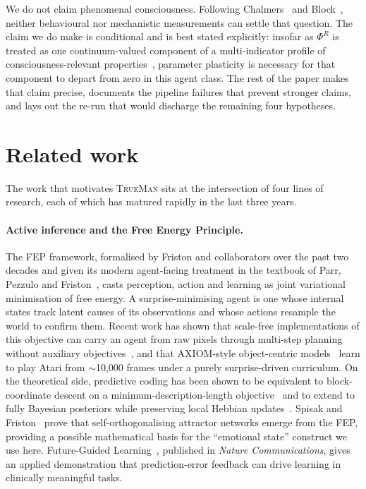 \documentclass[pdflatex,sn-mathphys-num]{sn-jnl}
\newcommand{\TrueMan}{\textsc{TrueMan}}
\theoremstyle{thmstyleone}
\theoremstyle{thmstylethree}
\begin{document}
We do not claim phenomenal consciousness. Following Chalmers~\cite{chalmers1995hard} and Block~\cite{block1995access}, neither behavioural nor mechanistic measurements can settle that question. The claim we do make is conditional and is best stated explicitly: insofar as $\Phi^R$ is treated as one continuum-valued component of a multi-indicator profile of consciousness-relevant properties~\cite{butlin2023consciousness, ny_declaration_2024}, parameter plasticity is necessary for that component to depart from zero in this agent class. The rest of the paper makes that claim precise, documents the pipeline failures that prevent stronger claims, and lays out the re-run that would discharge the remaining four hypotheses.

\section{Related work}\label{sec:related}

The work that motivates \TrueMan{} sits at the intersection of four lines of research, each of which has matured rapidly in the last three years.

\paragraph{Active inference and the Free Energy Principle.} The FEP framework, formalised by Friston and collaborators over the past two decades and given its modern agent-facing treatment in the textbook of Parr, Pezzulo and Friston~\cite{friston2022active}, casts perception, action and learning as joint variational minimisation of free energy. A surprise-minimising agent is one whose internal states track latent causes of its observations and whose actions resample the world to confirm them. Recent work has shown that scale-free implementations of this objective can carry an agent from raw pixels through multi-step planning without auxiliary objectives~\cite{friston2024scalefree}, and that AXIOM-style object-centric models~\cite{heins2025axiom} learn to play Atari from $\sim$10,000 frames under a purely surprise-driven curriculum. On the theoretical side, predictive coding has been shown to be equivalent to block-coordinate descent on a minimum-description-length objective~\cite{prada2025mdl} and to extend to fully Bayesian posteriors while preserving local Hebbian updates~\cite{tschantz2025bayesian}. Spisak and Friston~\cite{spisak2025attractor} prove that self-orthogonalising attractor networks emerge from the FEP, providing a possible mathematical basis for the ``emotional state'' construct we use here. Future-Guided Learning~\cite{gunasekaran2025future}, published in \emph{Nature Communications}, gives an applied demonstration that prediction-error feedback can drive learning in clinically meaningful tasks.
\end{document}

